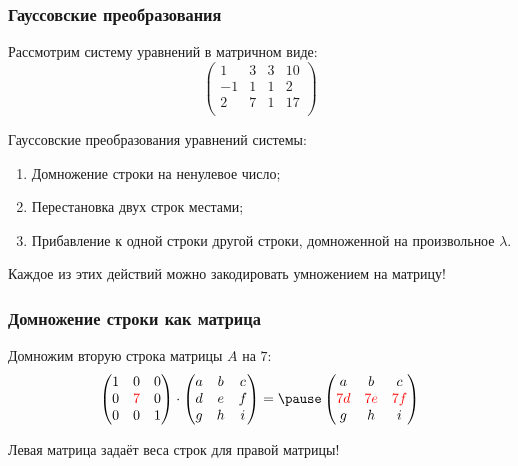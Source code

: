 \begin{frame}
    \frametitle{Гауссовские преобразования}

    Рассмотрим систему уравнений в матричном виде:
    \[
    \left(
    \begin{array}{ccc|c}
    1 & 3 & 3  & 10 \\
    -1 & 1 & 1 & 2 \\
    2 & 7 & 1  & 17 \\
    \end{array}
    \right)
    \]
    \pause

    Гауссовские преобразования уравнений системы:
    
    \begin{enumerate}
        \item Домножение строки на ненулевое число;
        \item Перестановка двух строк местами;
        \item Прибавление к одной строки другой строки, домноженной на произвольное $\lambda$.
    \end{enumerate}
    \pause
    Каждое из этих действий можно закодировать умножением на матрицу!

\end{frame}

\begin{frame}
    \frametitle{Домножение строки как матрица}


    Домножим вторую строка матрицы $A$ на $7$:
    \[
    \begin{pmatrix}
        1 & 0 & 0 \\
        0 & \red{7} & 0 \\
        0 & 0 & 1 \\
    \end{pmatrix}   \cdot 
    \begin{pmatrix}
        a & b & c \\
        d & e & f \\
        g & h & i \\
    \end{pmatrix} =\pause
\begin{pmatrix}
    a & b & c \\
    \red{7d} & \red{7e} & \red{7f} \\
    g & h & i \\
\end{pmatrix}   
    \]


Левая матрица задаёт веса строк для правой матрицы!


\end{frame}



